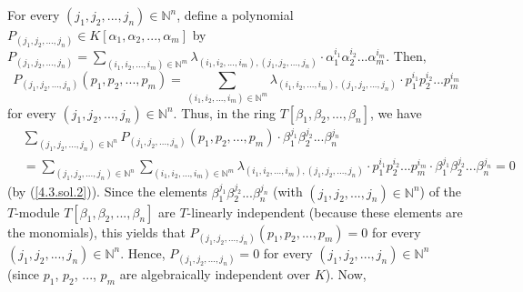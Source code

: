 \documentclass[numbers=enddot,12pt,final,onecolumn,notitlepage]{scrartcl}%
\begin{document}
For every $\left(  j_{1},j_{2},...,j_{n}\right)  \in\mathbb{N}^{n}$, define a
polynomial $P_{\left(  j_{1},j_{2},...,j_{n}\right)  }\in K\left[  \alpha
_{1},\alpha_{2},...,\alpha_{m}\right]  $ by $P_{\left(  j_{1},j_{2}%
,...,j_{n}\right)  }=\sum\limits_{\left(  i_{1},i_{2},...,i_{m}\right)
\in\mathbb{N}^{m}}\lambda_{\left(  i_{1},i_{2},...,i_{m}\right)  ,\left(
j_{1},j_{2},...,j_{n}\right)  }\cdot\alpha_{1}^{i_{1}}\alpha_{2}^{i_{2}%
}...\alpha_{m}^{i_{m}}$. Then,
\[
P_{\left(  j_{1},j_{2},...,j_{n}\right)  }\left(  p_{1},p_{2},...,p_{m}%
\right)  =\sum\limits_{\left(  i_{1},i_{2},...,i_{m}\right)  \in\mathbb{N}%
^{m}}\lambda_{\left(  i_{1},i_{2},...,i_{m}\right)  ,\left(  j_{1}%
,j_{2},...,j_{n}\right)  }\cdot p_{1}^{i_{1}}p_{2}^{i_{2}}...p_{m}^{i_{m}}%
\]
for every $\left(  j_{1},j_{2},...,j_{n}\right)  \in\mathbb{N}^{n}$. Thus, in
the ring $T\left[  \beta_{1},\beta_{2},\ldots,\beta_{n}\right]  $, we have%
\begin{align*}
&  \sum\limits_{\left(  j_{1},j_{2},...,j_{n}\right)  \in\mathbb{N}^{n}%
}P_{\left(  j_{1},j_{2},...,j_{n}\right)  }\left(  p_{1},p_{2},...,p_{m}%
\right)  \cdot\beta_{1}^{j_{1}}\beta_{2}^{j_{2}}...\beta_{n}^{j_{n}}\\
&  =\sum\limits_{\left(  j_{1},j_{2},...,j_{n}\right)  \in\mathbb{N}^{n}}%
\sum\limits_{\left(  i_{1},i_{2},...,i_{m}\right)  \in\mathbb{N}^{m}}%
\lambda_{\left(  i_{1},i_{2},...,i_{m}\right)  ,\left(  j_{1},j_{2}%
,...,j_{n}\right)  }\cdot p_{1}^{i_{1}}p_{2}^{i_{2}}...p_{m}^{i_{m}}\cdot
\beta_{1}^{j_{1}}\beta_{2}^{j_{2}}...\beta_{n}^{j_{n}}=0
\end{align*}
(by (\ref{4.3.sol.2})). Since the elements $\beta_{1}^{j_{1}}\beta_{2}^{j_{2}%
}...\beta_{n}^{j_{n}}$ (with $\left(  j_{1},j_{2},...,j_{n}\right)
\in\mathbb{N}^{n}$) of the $T$-module $T\left[  \beta_{1},\beta_{2}%
,...,\beta_{n}\right]  $ are $T$-linearly independent (because these elements
are the monomials), this yields that $P_{\left(  j_{1},j_{2},...,j_{n}\right)
}\left(  p_{1},p_{2},...,p_{m}\right)  =0$ for every $\left(  j_{1}%
,j_{2},...,j_{n}\right)  \in\mathbb{N}^{n}$. Hence, $P_{\left(  j_{1}%
,j_{2},...,j_{n}\right)  }=0$ for every $\left(  j_{1},j_{2},...,j_{n}\right)
\in\mathbb{N}^{n}$ (since $p_{1}$, $p_{2}$, $...$, $p_{m}$ are algebraically
independent over $K$). Now,%
\end{document}
